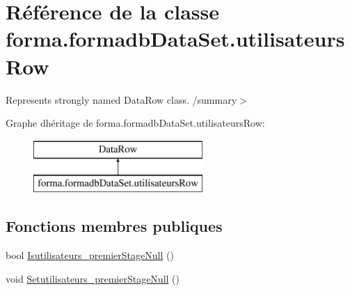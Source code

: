 \hypertarget{classforma_1_1formadb_data_set_1_1utilisateurs_row}{}\section{Référence de la classe forma.\+formadb\+Data\+Set.\+utilisateurs\+Row}
\label{classforma_1_1formadb_data_set_1_1utilisateurs_row}


Represents strongly named Data\+Row class. /summary$>$  


Graphe d\textquotesingle{}héritage de forma.\+formadb\+Data\+Set.\+utilisateurs\+Row\+:\begin{figure}[H]
\begin{center}
\leavevmode
\includegraphics[height=2.000000cm]{classforma_1_1formadb_data_set_1_1utilisateurs_row}
\end{center}
\end{figure}
\subsection*{Fonctions membres publiques}
\begin{DoxyCompactItemize}
\item 
bool \hyperlink{classforma_1_1formadb_data_set_1_1utilisateurs_row_a1914e050a09c0d2dd861f838a610506a}{Isutilisateurs\+\_\+premier\+Stage\+Null} ()
\item 
void \hyperlink{classforma_1_1formadb_data_set_1_1utilisateurs_row_ae8cfb7116a382518daddb6345ca78774}{Setutilisateurs\+\_\+premier\+Stage\+Null} ()
\end{DoxyCompactItemize}
